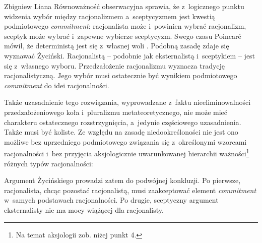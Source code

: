 \begin{artplenv}{Zbigniew Liana}
Równoważność obserwacyjna sprawia, że z~logicznego punktu widzenia wybór między racjonalizmem a~sceptycyzmem jest kwestią podmiotowego \textit{commitment}: racjonalista może i~powinien wybrać racjonalizm, sceptyk może wybrać i~zapewne wybierze sceptycyzm. Swego czasu Poincaré
\parencite*[][]{poincare_valeur_1905} %
 mówił, że deterministą jest się z~własnej woli 
\parencite[][s.~276.278]{szumilewicz-lachman_poincare_1978}. %
 Podobną zasadę zdaje się wyznawać Życiński. Racjonalistą -- podobnie jak eksternalistą i~sceptykiem -- jest się z~własnego wyboru. Przedzałożenie racjonalizmu wyznacza tradycję racjonalistyczną. Jego wybór musi ostatecznie być wynikiem podmiotowego \textit{commitment} do idei racjonalności.

Także uzasadnienie tego rozwiązania, wyprowadzane z~faktu nieeliminowalności przedzałożeniowego koła i~pluralizmu metateoretycznego, nie może mieć charakteru ostatecznego rozstrzygnięcia, a~jedynie częściowego uzasadnienia. Także musi być koliste. Ze względu na zasadę niedookreśloności nie jest ono możliwe bez uprzedniego podmiotowego związania się z~określonymi wzorcami racjonalności i~bez przyjęcia aksjologicznie uwarunkowanej hierarchii ważności\footnote{Na temat aksjologii zob. niżej punkt 4.} różnych typów racjonalności:


\enlargethispage{-\baselineskip}
Argument Życińskiego prowadzi zatem do podwójnej konkluzji. Po pierwsze, racjonalista, chcąc pozostać racjonalistą, musi zaakceptować element \textit{commitment} w~samych podstawach racjonalności. Po drugie, sceptyczny argument eksternalisty nie ma mocy wiążącej dla racjonalisty.


\end{artplenv}
